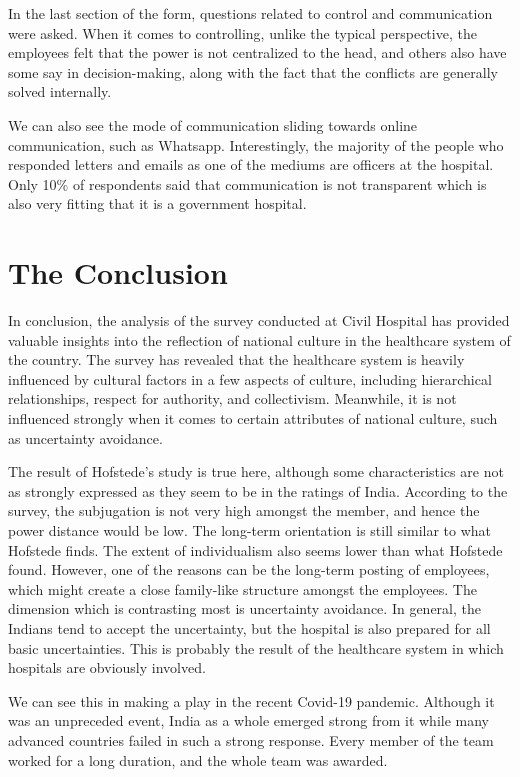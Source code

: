 \documentclass[12pt]{article}
\begin{document}
In the last section of the form, questions related to control and communication were asked. When it comes to controlling, unlike the typical perspective, the employees felt that the power is not centralized to the head, and others also have some say in decision-making, along with the fact that the conflicts are generally solved internally.

We can also see the mode of communication sliding towards online communication, such as Whatsapp. Interestingly, the majority of the people who responded letters and emails as one of the mediums are officers at the hospital. Only 10\% of respondents said that communication is not transparent which is also very fitting that it is a government hospital.

\section{The Conclusion}

In conclusion, the analysis of the survey conducted at Civil Hospital has provided valuable insights into the reflection of national culture in the healthcare system of the country. The survey has revealed that the healthcare system is heavily influenced by cultural factors in a few aspects of culture, including hierarchical relationships, respect for authority, and collectivism. Meanwhile, it is not influenced strongly when it comes to certain attributes of national culture, such as uncertainty avoidance.

The result of Hofstede's study is true here, although some characteristics are not as strongly expressed as they seem to be in the ratings of India. According to the survey, the subjugation is not very high amongst the member, and hence the power distance would be low. The long-term orientation is still similar to what Hofstede finds. The extent of individualism also seems lower than what Hofstede found. However, one of the reasons can be the long-term posting of employees, which might create a close family-like structure amongst the employees. The dimension which is contrasting most is uncertainty avoidance. In general, the Indians tend to accept the uncertainty, but the hospital is also prepared for all basic uncertainties. This is probably the result of the healthcare system in which hospitals are obviously involved.

We can see this in making a play in the recent Covid-19 pandemic. Although it was an unpreceded event, India as a whole emerged strong from it while many advanced countries failed in such a strong response. Every member of the team worked for a long duration, and the whole team was awarded.
\end{document}
